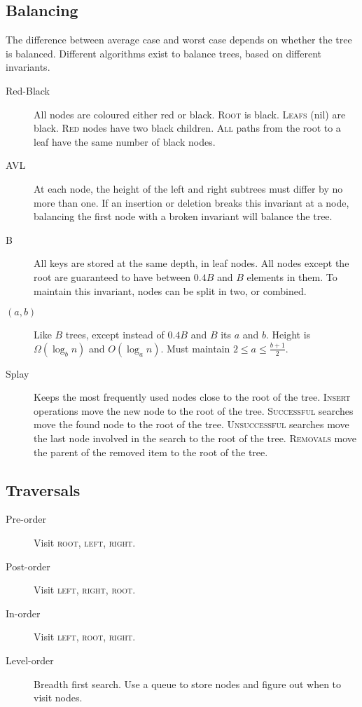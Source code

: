 \documentclass[landscape]{cheat}
\begin{document}
\begin{multicols}{3}
\subsection{Balancing}
The difference between average case and worst case depends on whether the tree is balanced.
Different algorithms exist to balance trees, based on different invariants.

\begin{description}
    \item[Red-Black]
        All nodes are coloured either red or black.
        \textsc{Root} is black.
        \textsc{Leafs} (nil) are black.
        \textsc{Red} nodes have two black children.
        \textsc{All} paths from the root to a leaf have the same number of black nodes.
    \item[AVL]
        At each node, the height of the left and right subtrees must differ by no more than one.
        If an insertion or deletion breaks this invariant at a node, balancing the first node with a broken invariant will balance the tree.
    \item[B]
        All keys are stored at the same depth, in leaf nodes.
        All nodes except the root are guaranteed to have between $0.4B$ and $B$ elements in them.
        To maintain this invariant, nodes can be split in two, or combined.
    \item[$(a,b)$]
        Like $B$ trees, except instead of $0.4B$ and $B$ its $a$ and $b$.
        Height is $\Omega(\log_b n)$ and $O(\log_a n)$.
        Must maintain $2 \leq a \leq \frac {b+1} 2$.
    \item[Splay]
        Keeps the most frequently used nodes close to the root of the tree.
        \textsc{Insert} operations move the new node to the root of the tree.
        \textsc{Successful} searches move the found node to the root of the tree.
        \textsc{Unsuccessful} searches move the last node involved in the search to the root of the tree.
        \textsc{Removals} move the parent of the removed item to the root of the tree.
\end{description}

\subsection{Traversals}
\begin{description}
    \item[Pre-order] Visit \textsc{root}, \textsc{left}, \textsc{right}.
    \item[Post-order] Visit \textsc{left}, \textsc{right}, \textsc{root}.
    \item[In-order] Visit \textsc{left}, \textsc{root}, \textsc{right}.
    \item[Level-order] Breadth first search. Use a queue to store nodes and figure out when to visit nodes.
\end{description}


\end{multicols}
\end{document}
